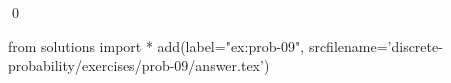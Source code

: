 
\begin{ex} 
  \label{ex:prob-09}
  
  \qed
\end{ex} 
\begin{python0}
from solutions import *
add(label="ex:prob-09",
    srcfilename='discrete-probability/exercises/prob-09/answer.tex') 
\end{python0}
